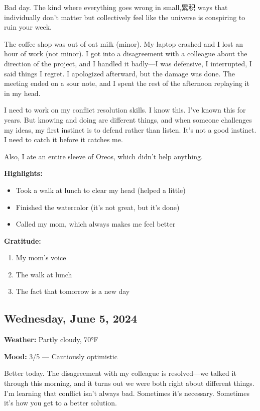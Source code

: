 \documentclass[
    language=english,
    doctype=journal,
    institution=none,
]{../../omnilatex}
\begin{document}
Bad day. The kind where everything goes wrong in small,累积 ways that individually don't matter but collectively feel like the universe is conspiring to ruin your week.

The coffee shop was out of oat milk (minor). My laptop crashed and I lost an hour of work (not minor). I got into a disagreement with a colleague about the direction of the project, and I handled it badly---I was defensive, I interrupted, I said things I regret. I apologized afterward, but the damage was done. The meeting ended on a sour note, and I spent the rest of the afternoon replaying it in my head.

I need to work on my conflict resolution skills. I know this. I've known this for years. But knowing and doing are different things, and when someone challenges my ideas, my first instinct is to defend rather than listen. It's not a good instinct. I need to catch it before it catches me.

Also, I ate an entire sleeve of Oreos, which didn't help anything.

\textbf{Highlights:}
\begin{itemize}
    \item Took a walk at lunch to clear my head (helped a little)
    \item Finished the watercolor (it's not great, but it's done)
    \item Called my mom, which always makes me feel better
\end{itemize}

\textbf{Gratitude:}
\begin{enumerate}
    \item My mom's voice
    \item The walk at lunch
    \item The fact that tomorrow is a new day
\end{enumerate}

\subsection{Wednesday, June 5, 2024}

\textbf{Weather:} Partly cloudy, 70°F

\textbf{Mood:} 3/5 --- Cautiously optimistic

Better today. The disagreement with my colleague is resolved---we talked it through this morning, and it turns out we were both right about different things. I'm learning that conflict isn't always bad. Sometimes it's necessary. Sometimes it's how you get to a better solution.
\end{document}
